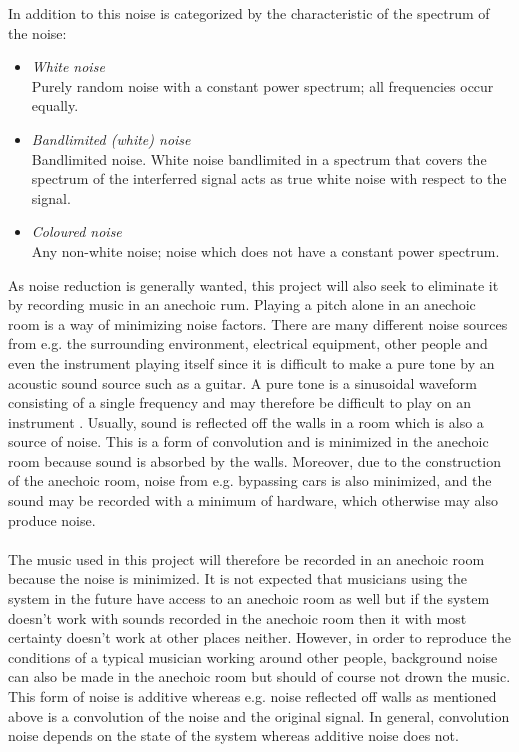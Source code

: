 In addition to this noise is categorized by the characteristic of the spectrum of the noise:
\begin{itemize}
\item \textit{White noise}\\
Purely random noise with a constant power spectrum; all frequencies occur equally.
\item \textit{Bandlimited (white) noise}\\
Bandlimited noise. White noise bandlimited in a spectrum that covers the spectrum of the interferred signal acts as true white noise with respect to the signal.
\item \textit{Coloured noise}\\
Any non-white noise; noise which does not have a constant power spectrum.
\end{itemize}

As noise reduction is generally wanted, this project will also seek to eliminate it by recording music in an anechoic rum. Playing a pitch alone in an anechoic room is a way of minimizing noise factors. There are many different noise sources from e.g. the surrounding environment, electrical equipment, other people and even the instrument playing itself since it is difficult to make a pure tone by an acoustic sound source such as a guitar. A pure tone is a sinusoidal waveform consisting of a single frequency and may therefore be difficult to play on an instrument \cite{AcousticNoise}. Usually, sound is reflected off the walls in a room which is also a source of noise. This is a form of convolution and is minimized in the anechoic room because sound is absorbed by the walls. Moreover, due to the construction of the anechoic room, noise from e.g. bypassing cars is also minimized, and the sound may be recorded with a minimum of hardware, which otherwise may also produce noise.
\\ \\
The music used in this project will therefore be recorded in an anechoic room because the noise is minimized. 
It is not expected that musicians using the system in the future have access to an anechoic room as well but if the system doesn't work with sounds recorded in the anechoic room then it with most certainty doesn't work at other places neither.  However, in order to reproduce the conditions of a typical musician working around other people, background noise can also be made in the anechoic room but should of course not drown the music. This form of noise is additive whereas e.g. noise reflected off walls as mentioned above is a convolution of the noise and the original signal. In general, convolution noise depends on the state of the system whereas additive noise does not.

